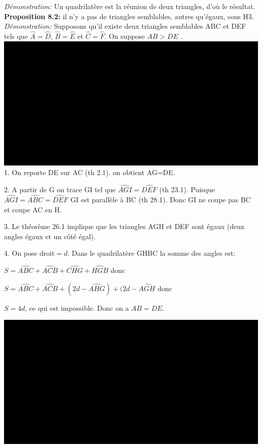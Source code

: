 \documentclass[a4paper, 12pt, twoside]{book}
\begin{document}
    \textit{Démonstration:} Un quadrilatère est la réunion de deux triangles, d'où le résultat.\\
    
\textbf{Proposition 8.2:} il n'y a pas de triangles semblables, autres qu'égaux, sous H3.\\

\textit{Démonstration:} Supposons qu'il existe deux triangles semblables ABC et DEF tels que $\hat{A}=\hat{D}$, $\hat{B}=\hat{E}$ et  $\hat{C}=\hat{F}$. On suppose $AB>DE$ .\\

 \includegraphics[scale=0.4]{figures/lambert10.eps} \\

1. On reporte DE sur AC (th 2.1). on obtient AG=DE.\

2. A partir de G on trace GI tel que $\hat{AGI}=\hat{DEF}$ (th 23.1). Puisque $\hat{AGI}=\hat{ABC}=\hat{DEF}$  GI est parallèle à BC (th 28.1). Donc GI ne coupe pas BC et coupe AC en H.\

 
3. Le théorème 26.1 implique que les triangles AGH et DEF sont égaux (deux angles égaux et un côté égal).\

4. On pose droit$=d$. Dans le quadrilatère GHBC la somme des angles est:\

$S=\hat{ABC}+\hat{ACB}+\hat{CHG}+\hat{HGB}$ donc\

$S=\hat{ABC}+\hat{ACB}+(2d-\hat{AHG})+(2d-\hat{AGH}$ donc\

$S=4d$, ce qui est impossible. Donc on a $AB=DE$.






 

   \includegraphics[scale=0.4]{figures/lambert10.eps} \
   
\end{document}
